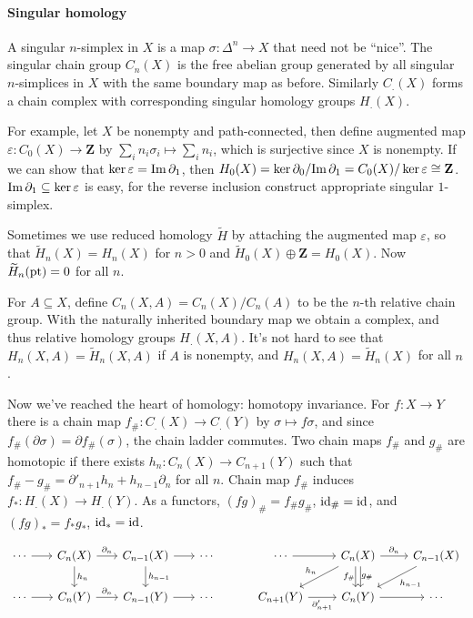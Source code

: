 \documentclass[11pt]{article}
\theoremstyle{definition}
\theoremstyle{plain}
\newcommand{\id}{\textup{id}}
\newcommand{\im}{\textup{Im}\,}
\newcommand{\Z}{\mathbf{Z}}
\newcommand{\pt}{\textup{pt}}
\begin{document}
\paragraph{Singular homology}

A singular $n$-simplex in $X$ is a map $\sigma:\Delta^n\to X$ that need not be ``nice''. The singular chain group $C_n(X)$ is the free abelian group generated by all singular $n$-simplices in $X$ with the same boundary map as before. Similarly $C_.(X)$ forms a chain complex with corresponding singular homology groups $H_.(X)$.\medbreak

For example, let $X$ be nonempty and path-connected, then define augmented map $\varepsilon:C_0(X)\to\Z$ by $\sum_in_i\sigma_i\mapsto\sum_in_i$, which is surjective since $X$ is nonempty. If we can show that $\ker\varepsilon=\im\partial_1$, then $H_0(X)=\ker\partial_0/\im\partial_1=C_0(X)/\ker\varepsilon\cong\Z$. $\im\partial_1\subseteq\ker\varepsilon$ is easy, for the reverse inclusion construct appropriate singular $1$-simplex.\medbreak

Sometimes we use reduced homology $\widetilde{H}$ by attaching the augmented map $\varepsilon$, so that $\widetilde{H}_n(X)=H_n(X)$ for $n>0$ and $\widetilde{H}_0(X)\oplus\Z=H_0(X)$. Now $\widetilde{H}_n(\pt)=0$ for all $n$.\medbreak

For $A\subseteq X$, define $C_n(X,A)=C_n(X)/C_n(A)$ to be the $n$-th relative chain group. With the naturally inherited boundary map we obtain a complex, and thus relative homology groups $H_.(X,A)$. It's not hard to see that $H_n(X,A)=\widetilde{H}_n(X,A)$ if $A$ is nonempty, and $H_n(X,A)=\widetilde{H}_n(X)$ for all $n$.\medbreak

Now we've reached the heart of homology: homotopy invariance. For $f:X\to Y$ there is a chain map $f_\#:C_.(X)\to C_.(Y)$ by $\sigma\mapsto f\sigma$, and since $f_\#(\partial\sigma)=\partial f_\#(\sigma)$, the chain ladder commutes. Two chain maps $f_\#$ and $g_\#$ are homotopic if there exists $h_n:C_n(X)\to C_{n+1}(Y)$ such that $f_\#-g_\#=\partial'_{n+1}h_n+h_{n-1}\partial_n$ for all $n$. Chain map $f_\#$ induces $f_\ast:H_.(X)\to H_.(Y)$. As a functors, $(fg)_\#=f_\#g_\#$, $\id_\#=\id$, and $(fg)_\ast=f_\ast g_\ast$, $\id_\ast=\id$.

\[\begin{tikzcd}[column sep=scriptsize]
\cdots\arrow{r}&C_n(X)\arrow{d}{h_n}\arrow{r}{\partial_n}&C_{n-1}(X)\arrow{d}{h_{n-1}}\arrow{r}&\cdots\\
\cdots\arrow{r}&C_n(Y)\arrow{r}{\partial_n}&C_{n-1}(Y)\arrow{r}&\cdots
\end{tikzcd}\quad\quad\quad\begin{tikzcd}
\cdots\arrow[r]&C_n(X)\arrow[d,xshift=0.5ex,"f_\#"'{xshift=-0.6ex}]\arrow[d,xshift=-0.5ex,"g_\#"{xshift=0.6ex}]\arrow[swap]{dl}{h_n}\arrow{r}{\partial_n}&C_{n-1}(X)\arrow{dl}{h_{n-1}}\\
C_{n+1}(Y)\arrow[swap]{r}{\partial'_{n+1}}&C_n(Y)\arrow[r]&\cdots
\end{tikzcd}\]
\end{document}

